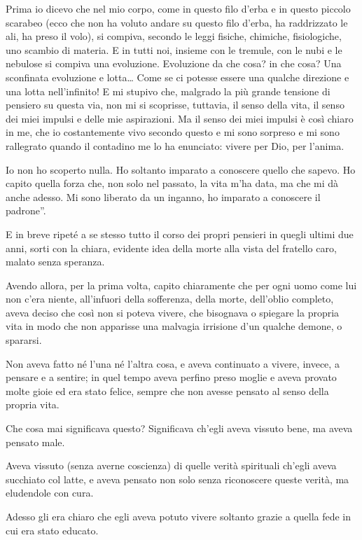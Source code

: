 Prima io dicevo che nel mio corpo, come in questo filo d'erba e in questo piccolo scarabeo (ecco che non ha voluto andare su questo filo d'erba, ha raddrizzato le ali, ha preso il volo), si compiva, secondo le leggi fisiche, chimiche, fisiologiche, uno scambio di materia. E in tutti noi, insieme con le tremule, con le nubi e le nebulose si compiva una evoluzione. Evoluzione da che cosa? in che cosa? Una sconfinata evoluzione e lotta\ldots{} Come se ci potesse essere una qualche direzione e una lotta nell'infinito! E mi stupivo che, malgrado la più grande tensione di pensiero su questa via, non mi si scoprisse, tuttavia, il senso della vita, il senso dei miei impulsi e delle mie aspirazioni. Ma il senso dei miei impulsi è così chiaro in me, che io costantemente vivo secondo questo e mi sono sorpreso e mi sono rallegrato quando il contadino me lo ha enunciato: vivere per Dio, per l'anima. 

Io non ho scoperto nulla. Ho soltanto imparato a conoscere quello che sapevo. Ho capito quella forza che, non solo nel passato, la vita m'ha data, ma che mi dà anche adesso. Mi sono liberato da un inganno, ho imparato a conoscere il padrone''. 

E in breve ripeté a se stesso tutto il corso dei propri pensieri in quegli ultimi due anni, sorti con la chiara, evidente idea della morte alla vista del fratello caro, malato senza speranza. 

Avendo allora, per la prima volta, capito chiaramente che per ogni uomo come lui non c'era niente, all'infuori della sofferenza, della morte, dell'oblio completo, aveva deciso che così non si poteva vivere, che bisognava o spiegare la propria vita in modo che non apparisse una malvagia irrisione d'un qualche demone, o spararsi. 

Non aveva fatto né l'una né l'altra cosa, e aveva continuato a vivere, invece, a pensare e a sentire; in quel tempo aveva perfino preso moglie e aveva provato molte gioie ed era stato felice, sempre che non avesse pensato al senso della propria vita. 

Che cosa mai significava questo? Significava ch'egli aveva vissuto bene, ma aveva pensato male. 

Aveva vissuto (senza averne coscienza) di quelle verità spirituali ch'egli aveva succhiato col latte, e aveva pensato non solo senza riconoscere queste verità, ma eludendole con cura. 

Adesso gli era chiaro che egli aveva potuto vivere soltanto grazie a quella fede in cui era stato educato. 

